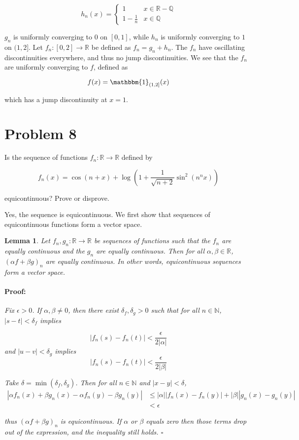 \documentclass{article}
\newenvironment{proof}{\paragraph{Proof:}}{\hfill$\square$}
\newtheorem{lemma}[theorem]{Lemma}
\newcommand{\R}{\mathbb{R}}
\newcommand{\Q}{\mathbb{Q}}
\newcommand{\N}{\mathbb{N}}
\newcommand{\ind}{\mathbbm{1}}
\begin{document}
\[
h_n(x) = 
\begin{cases}
1 & x \in \R - \Q \\
1- \frac{1}{n} & x \in \Q
\end{cases}
\]

$g_n$ is uniformly converging to $0$ on $[0, 1]$, while $h_n$ is uniformly converging to $1$ on $(1, 2]$. Let $f_n: [0, 2] \rightarrow \R$ be defined as $f_n = g_n + h_n$. The $f_n$ have oscillating discontinuities everywhere, and thus no jump discontinuities. We see that the $f_n$ are uniformly converging to $f$, defined as

\[
f(x) = \ind_{(1, 2]}(x)
\]

which has a jump discontinuity at $x=1$.

\section*{Problem 8}

Is the sequence of functions $f_n: \R \rightarrow \R$ defined by

\[
f_n(x) = \cos(n+x) + \log(1 + \frac{1}{\sqrt{n+2}} \sin^2(n^n x))
\]

equicontinuous? Prove or disprove.

Yes, the sequence is equicontinuous. We first show that sequences of equicontinuous functions form a vector space.

\begin{lemma}
Let $f_n, g_n: \R \rightarrow \R$ be sequences of functions such that the $f_n$ are equally continuous and the $g_n$ are equally continuous. Then for all $\alpha, \beta \in \R$, $(\alpha f + \beta g)_n$ are equally continuous. In other words, equicontinuous sequences form a vector space.

\begin{proof}
Fix $\epsilon > 0$. If $\alpha, \beta \neq 0$, then there exist $\delta_f, \delta_g > 0$ such that for all $n \in \N$, $|s-t| < \delta_f$ implies

\[
|f_n(s) - f_n(t)| < \frac{\epsilon}{2 |\alpha|}
\]
and $|u -v| < \delta_g$ implies
\[
|f_n(s) - f_n(t)| < \frac{\epsilon}{2 |\beta|}
\]

Take $\delta = \min(\delta_f, \delta_g)$. Then for all $n \in \N$ and $|x-y| < \delta$,
\begin{align*}
|\alpha f_n(x) + \beta g_n(x) - \alpha f_n(y) - \beta g_n(y)| &\leq |\alpha||f_n(x) - f_n(y)| + |\beta||g_n(x) - g_n(y)| \\
&< \epsilon
\end{align*}

thus $(\alpha f + \beta g)_n$ is equicontinuous. If $\alpha$ or $\beta$ equals zero then those terms drop out of the expression, and the inequality still holds.
\end{proof}
\end{lemma}
\end{document}
